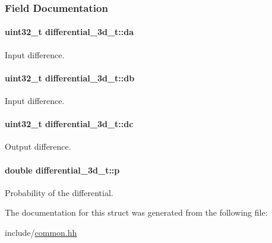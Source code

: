 \subsubsection{\-Field \-Documentation}
\hypertarget{structdifferential__3d__t_a919d7341177d47821256bd3fcecee5ac}{
\paragraph[{da}]{\setlength{\rightskip}{0pt plus 5cm}uint32\-\_\-t {\bf differential\-\_\-3d\-\_\-t\-::da}}}\label{structdifferential__3d__t_a919d7341177d47821256bd3fcecee5ac}
\-Input difference. \hypertarget{structdifferential__3d__t_af9070aa3529362eb2d0c4d05fc076f25}{
\paragraph[{db}]{\setlength{\rightskip}{0pt plus 5cm}uint32\-\_\-t {\bf differential\-\_\-3d\-\_\-t\-::db}}}\label{structdifferential__3d__t_af9070aa3529362eb2d0c4d05fc076f25}
\-Input difference. \hypertarget{structdifferential__3d__t_a4d88f84082f6d4f5ca5d51296f5b14f7}{
\paragraph[{dc}]{\setlength{\rightskip}{0pt plus 5cm}uint32\-\_\-t {\bf differential\-\_\-3d\-\_\-t\-::dc}}}\label{structdifferential__3d__t_a4d88f84082f6d4f5ca5d51296f5b14f7}
\-Output difference. \hypertarget{structdifferential__3d__t_ae05166f2726fa29861fb01752f6c8c8a}{
\paragraph[{p}]{\setlength{\rightskip}{0pt plus 5cm}double {\bf differential\-\_\-3d\-\_\-t\-::p}}}\label{structdifferential__3d__t_ae05166f2726fa29861fb01752f6c8c8a}
\-Probability of the differential. 

\-The documentation for this struct was generated from the following file\-:\begin{DoxyCompactItemize}
\item 
include/\hyperlink{common_8hh}{common.\-hh}\end{DoxyCompactItemize}

